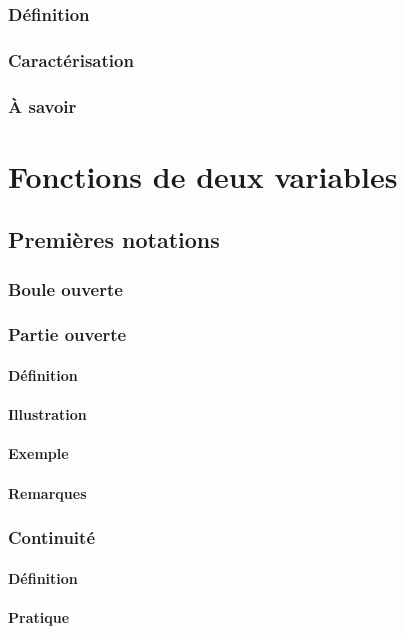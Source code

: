 \documentclass[12pt,a4paper,french]{book}
\begin{document}
		\subsection{Définition}
		\subsection{Caractérisation}
		\subsection{À savoir}
		
\chapter{Fonctions de deux variables}
	\section{Premières notations}
		\subsection{Boule ouverte}
		\subsection{Partie ouverte}
			\subsubsection{Définition}
			\subsubsection{Illustration}
			\subsubsection{Exemple}
			\subsubsection{Remarques}
		\subsection{Continuité}
			\subsubsection{Définition}
			\subsubsection{Pratique}
\end{document}
